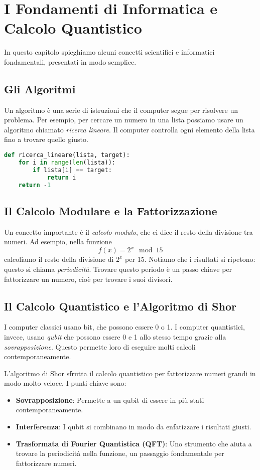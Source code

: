 \documentclass[a4paper,12pt]{book}
\begin{document}
\chapter{I Fondamenti di Informatica e Calcolo Quantistico}

In questo capitolo spieghiamo alcuni concetti scientifici e informatici fondamentali, presentati in modo semplice.

\section{Gli Algoritmi}
Un algoritmo è una serie di istruzioni che il computer segue per risolvere un problema. Per esempio, per cercare un numero in una lista possiamo usare un algoritmo chiamato \emph{ricerca lineare}. Il computer controlla ogni elemento della lista fino a trovare quello giusto.

\begin{lstlisting}[language=Python, caption={Esempio di Ricerca Lineare}]
def ricerca_lineare(lista, target):
    for i in range(len(lista)):
        if lista[i] == target:
            return i
    return -1
\end{lstlisting}

\section{Il Calcolo Modulare e la Fattorizzazione}
Un concetto importante è il \emph{calcolo modulo}, che ci dice il resto della divisione tra numeri. Ad esempio, nella funzione
\[
f(x)=2^x \mod 15
\]
calcoliamo il resto della divisione di \(2^x\) per 15. Notiamo che i risultati si ripetono: questo si chiama \emph{periodicità}. Trovare questo periodo è un passo chiave per fattorizzare un numero, cioè per trovare i suoi divisori.

\section{Il Calcolo Quantistico e l'Algoritmo di Shor}
I computer classici usano bit, che possono essere 0 o 1. I computer quantistici, invece, usano \emph{qubit} che possono essere 0 e 1 allo stesso tempo grazie alla \emph{sovrapposizione}. Questo permette loro di eseguire molti calcoli contemporaneamente.

L'algoritmo di Shor sfrutta il calcolo quantistico per fattorizzare numeri grandi in modo molto veloce. I punti chiave sono:
\begin{itemize}
  \item \textbf{Sovrapposizione}: Permette a un qubit di essere in più stati contemporaneamente.
  \item \textbf{Interferenza}: I qubit si combinano in modo da enfatizzare i risultati giusti.
  \item \textbf{Trasformata di Fourier Quantistica (QFT)}: Uno strumento che aiuta a trovare la periodicità nella funzione, un passaggio fondamentale per fattorizzare numeri.
\end{itemize}
\end{document}
